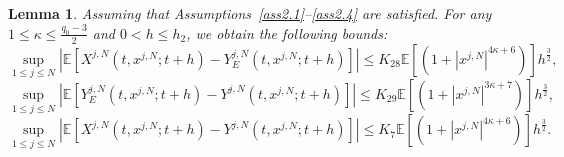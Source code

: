 \documentclass[12pt]{article}
\numberwithin{equation}{section}
\newtheorem{lemma}[assumption]{Lemma}
\begin{document}
\begin{lemma}\label{lemma5.6}
Assuming that Assumptions~\ref{ass2.1}--\ref{ass2.4} are satisfied.  For any $1\leq \kappa \leq \tfrac{q_0-3}{2}$ and $0<h \leq h_2$, we obtain the following bounds: 
\begin{equation}\tag{5.95}\label{5.66}
\underset{1\leqslant j\leqslant N}{\sup}\left|\mathbb{E}\left[X^{j,N}\left(t, x^{j,N} ; t+h\right)-Y^{j,N}_{E}\left(t, x^{j,N}; t+h\right)\right]\right| \leq K_{28}\mathbb{E}\left[\left(1+\left|x^{j,N}\right|^{4 \kappa+6}\right)\right] h^{\frac{3}{2}} ,
\end{equation}
\begin{equation}\tag{5.96}\label{5.67}
\underset{1\leqslant j\leqslant N}{\sup}\left|\mathbb{E}\left[Y^{j,N}_{E}\left(t, x^{j,N} ; t+h\right)-Y^{j,N}\left(t, x^{j,N} ; t+h\right)\right]\right|  \leq K_{29}\mathbb{E}\left[\left(1+\left|x^{j,N}\right|^{3 \kappa+7}\right)\right] h^{\frac{3}{2}}, 
\end{equation}
\begin{equation}\tag{5.97}\label{5.68}
\underset{1\leqslant j\leqslant N}{\sup}\left|\mathbb{E}\left[X^{j,N}\left(t, x^{j,N} ; t+h\right)-Y^{j,N}\left(t, x^{j,N} ; t+h\right)\right]\right|  \leq K_{7}\mathbb{E}\left[\left(1+\left|x^{j,N}\right|^{ 4\kappa+6}\right)\right] h^{\frac{3}{2}}.
\end{equation}
\end{lemma}
\end{document}
